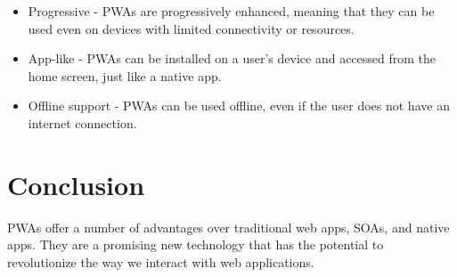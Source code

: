 \documentclass{report}
\begin{document}
\begin{itemize}
    \item Progressive - PWAs are progressively enhanced, meaning that they can be used even on devices with limited connectivity or resources.
    \item App-like - PWAs can be installed on a user's device and accessed from the home screen, just like a native app.
    \item Offline support - PWAs can be used offline, even if the user does not have an internet connection.
\end{itemize}

\section{Conclusion}\label{Conclusion}
PWAs offer a number of advantages over traditional web apps, SOAs, and native apps. They are a promising new technology that has the potential to revolutionize the way we interact with web applications.




%

\end{document}
